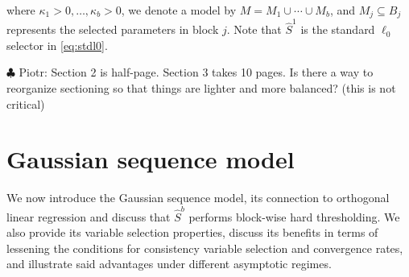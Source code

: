 \documentclass[aos]{imsart}
\theoremstyle{plain}
\newcommand{\piotr}[1]{{\small{\color{red} \sf $\clubsuit$ Piotr: #1}}}
\newcommand{\paul}[1]{{\small{\color{green} \sf $\spadesuit$ Paul: #1}}}
\newcommand{\bs}{\boldsymbol}
\begin{document}
where $\kappa_1>0,\ldots,\kappa_b>0$, we denote a model by $M=M_1\cup\cdots\cup M_b$, and $M_j\subseteq B_j$ represents the  selected parameters in block $j$. %
Note that $\hat{S}^1$ is the standard $\ell_0$ selector in \eqref{eq:stdl0}.


\piotr{Section 2 is half-page. Section 3 takes 10 pages. Is there a way to reorganize sectioning so that things are lighter and more balanced? (this is not critical)}
\section{Gaussian sequence model}\label{sec:properties_orth}

We now introduce the Gaussian sequence model, its connection to orthogonal linear regression and discuss that $\hat S^b$ performs block-wise hard thresholding. We also provide its variable selection properties, discuss its benefits in terms of lessening the conditions for consistency variable selection and convergence rates, and illustrate said advantages under different asymptotic regimes.
\end{document}
